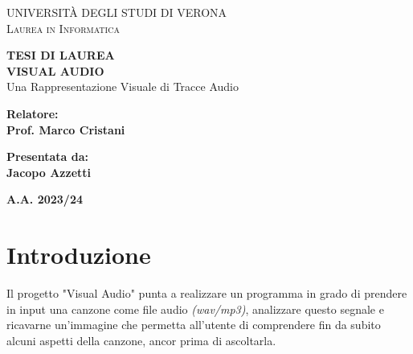\documentclass{article}
\begin{document}
\begin{titlepage}
    \begin{center}
        {{\Large{\textsc{UNIVERSITÀ DEGLI STUDI DI VERONA}}}}\\
        \vspace{5mm}
        {{\Large{\textsc{Laurea in Informatica}}}}

    \end{center}
    \vspace{20mm}
    \begin{center}
        {\LARGE{\bf TESI DI LAUREA}}\\
        \vspace{20 mm}
        {\LARGE{\bf VISUAL AUDIO}}\\
        \vspace{3 mm}
        {\LARGE{Una Rappresentazione Visuale di Tracce Audio}}
    \end{center}
    \vspace{40mm}
    \par
    \noindent
    \begin{minipage}[t]{0.47\textwidth}
        {\large{\bf Relatore:\\
                Prof. Marco Cristani}}
    \end{minipage}
    \hfill
    \begin{minipage}[t]{0.47\textwidth}\raggedleft
        {\large{\bf Presentata da:\\
                Jacopo Azzetti}}
    \end{minipage}
    \vspace{20mm}
    \begin{center}
        {\large{\bf A.A. 2023/24 }}%
    \end{center}
\end{titlepage}

\newpage
\tableofcontents
\newpage

\section{Introduzione}
\label{sec:intro}
Il progetto "Visual Audio" punta a realizzare un programma in grado di prendere in input una canzone come file audio \textit{(wav/mp3)}, analizzare questo segnale e ricavarne un'immagine che permetta all'utente di comprendere fin da subito alcuni aspetti della canzone, ancor prima di ascoltarla.\\
\end{document}
